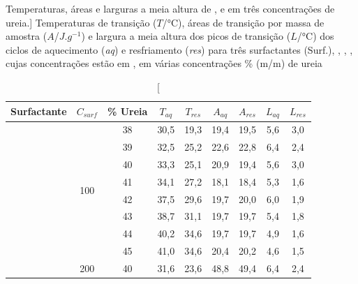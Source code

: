	
    \begin{table}[h]
        \IBGEtab%
        {\caption%
        	[Temperaturas, áreas e larguras a meia altura de \CTAB, \TTAB{} e \DTAB{} em três concentrações de ureia.]%
        	{Temperaturas de transição (\(T\)/°C), áreas de transição por massa de amostra (\(A\)/\(J.g^{-1}\)) e largura a meia altura dos picos de transição (\(L\)/°C) dos ciclos de aquecimento (\emph{aq}) e resfriamento (\emph{res}) para três surfactantes (Surf.), \CTAB, \TTAB, \DTAB, cujas concentrações estão em \mM, em várias concentrações \% (m/m) de ureia}
        \label{tab:DSC_temp_areas}}%
        {\begin{tabular}{ccccccccc}
        	\toprule
        	     Surfactante       &     \(C_{surf}\)     & \% Ureia & \(T_{aq}\) & \(T_{res}\) & \(A_{aq}\) & \(A_{res}\) & \(L_{aq}\) & \(L_{res}\) \\ \midrule
        	\multirow{8}{*}{\CTAB} & \multirow{8}{*}{100} &    38    &    30,5    &    19,3     &    19,4    &    19,5     &    5,6     &     3,0     \\
        	                       &                      &    39    &    32,5    &    25,2     &    22,6    &    22,8     &    6,4     &     2,4     \\
        	                       &                      &    40    &    33,3    &    25,1     &    20,9    &    19,4     &    5,6     &     3,0     \\
        	                       &                      &    41    &    34,1    &    27,2     &    18,1    &    18,4     &    5,3     &     1,6     \\
        	                       &                      &    42    &    37,5    &    29,6     &    19,7    &    20,0     &    6,0     &     1,9     \\
        	                       &                      &    43    &    38,7    &    31,1     &    19,7    &    19,7     &    5,4     &     1,8     \\
        	                       &                      &    44    &    40,2    &    34,6     &    19,7    &    19,7     &    4,9     &     1,6     \\
        	                       &                      &    45    &    41,0    &    34,6     &    20,4    &    20,2     &    4,6     &     1,5     \\ \midrule
        	\multirow{2}{*}{\CTAB} &         200          &    40    &    31,6    &    23,6     &    48,8    &    49,4     &    6,4     &     2,4     \\

\end{tabular}}
\end{table}

